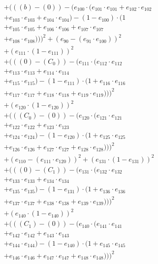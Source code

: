 \documentclass[10pt, a4paper]{article}
\begin{document}
\begin{small}
\begin{align*}
& + (((b) - (0)) - (e_{100} \cdot (e_{101} \cdot e_{101} + e_{102} \cdot e_{102} \\
& + e_{103} \cdot e_{103} + e_{104} \cdot e_{104}) - (1 - e_{100}) \cdot (1 \\
& + e_{105} \cdot e_{105} + e_{106} \cdot e_{106} + e_{107} \cdot e_{107} \\
& + e_{108} \cdot e_{108})))^{2} + (e_{90} - (e_{91} \cdot e_{100}))^{2} \\
& + (e_{111} \cdot (1 - e_{111}))^{2} \\
& + (((0) - (C_{0})) - (e_{111} \cdot (e_{112} \cdot e_{112} \\
& + e_{113} \cdot e_{113} + e_{114} \cdot e_{114} \\
& + e_{115} \cdot e_{115}) - (1 - e_{111}) \cdot (1 + e_{116} \cdot e_{116} \\
& + e_{117} \cdot e_{117} + e_{118} \cdot e_{118} + e_{119} \cdot e_{119})))^{2} \\
& + (e_{120} \cdot (1 - e_{120}))^{2} \\
& + (((C_{0}) - (0)) - (e_{120} \cdot (e_{121} \cdot e_{121} \\
& + e_{122} \cdot e_{122} + e_{123} \cdot e_{123} \\
& + e_{124} \cdot e_{124}) - (1 - e_{120}) \cdot (1 + e_{125} \cdot e_{125} \\
& + e_{126} \cdot e_{126} + e_{127} \cdot e_{127} + e_{128} \cdot e_{128})))^{2} \\
& + (e_{110} - (e_{111} \cdot e_{120}))^{2} + (e_{131} \cdot (1 - e_{131}))^{2} \\
& + (((0) - (C_{1})) - (e_{131} \cdot (e_{132} \cdot e_{132} \\
& + e_{133} \cdot e_{133} + e_{134} \cdot e_{134} \\
& + e_{135} \cdot e_{135}) - (1 - e_{131}) \cdot (1 + e_{136} \cdot e_{136} \\
& + e_{137} \cdot e_{137} + e_{138} \cdot e_{138} + e_{139} \cdot e_{139})))^{2} \\
& + (e_{140} \cdot (1 - e_{140}))^{2} \\
& + (((C_{1}) - (0)) - (e_{140} \cdot (e_{141} \cdot e_{141} \\
& + e_{142} \cdot e_{142} + e_{143} \cdot e_{143} \\
& + e_{144} \cdot e_{144}) - (1 - e_{140}) \cdot (1 + e_{145} \cdot e_{145} \\
& + e_{146} \cdot e_{146} + e_{147} \cdot e_{147} + e_{148} \cdot e_{148})))^{2} \\

\end{align*}
\end{small}
\end{document}
